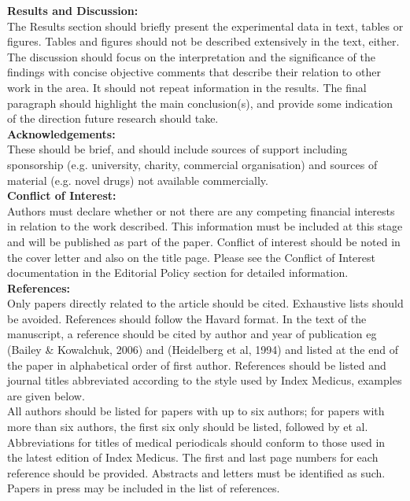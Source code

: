 \documentclass{article}
\begin{document}
\textbf{Results and Discussion:}\\

The Results section should briefly present the experimental data in
text, tables or figures. Tables and figures should not be described
extensively in the text, either. The discussion should focus on the
interpretation and the significance of the findings with concise
objective comments that describe their relation to other work in the
area. It should not repeat information in the results. The final
paragraph should highlight the main conclusion(s), and provide some
indication of the direction future research should take.\\

\textbf{Acknowledgements:}\\

These should be brief, and should include sources of support including
sponsorship (e.g. university, charity, commercial organisation) and
sources of material (e.g. novel drugs) not available commercially.\\

\textbf{Conflict of Interest:}\\

Authors must declare whether or not there are any competing financial
interests in relation to the work described. This information must be
included at this stage and will be published as part of the paper.
Conflict of interest should be noted in the cover letter and also on the
title page. Please see the Conflict of Interest documentation in the
Editorial Policy section for detailed information.\\

\textbf{References:}\\

Only papers directly related to the article should be cited. Exhaustive
lists should be avoided. References should follow the Havard format. In
the text of the manuscript, a reference should be cited by author and
year of publication eg (Bailey \& Kowalchuk, 2006) and (Heidelberg et
al, 1994) and listed at the end of the paper in alphabetical order of
first author. References should be listed and journal titles abbreviated
according to the style used by Index Medicus, examples are given
below.\\

All authors should be listed for papers with up to six authors; for
papers with more than six authors, the first six only should be listed,
followed by et al. Abbreviations for titles of medical periodicals
should conform to those used in the latest edition of Index Medicus. The
first and last page numbers for each reference should be provided.
Abstracts and letters must be identified as such. Papers in press may be
included in the list of references.\\
\end{document}
